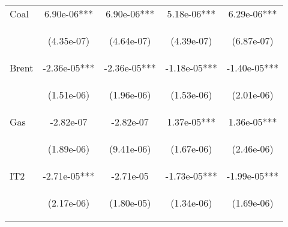 \begin{center}
\begin{tabular}{lcccc}
Coal & 6.90e-06*** & 6.90e-06*** & 5.18e-06*** & 6.29e-06*** \\
\vspace{4pt} & \begin{footnotesize}(4.35e-07)\end{footnotesize} & \begin{footnotesize}(4.64e-07)\end{footnotesize} & \begin{footnotesize}(4.39e-07)\end{footnotesize} & \begin{footnotesize}(6.87e-07)\end{footnotesize} \\
Brent & -2.36e-05*** & -2.36e-05*** & -1.18e-05*** & -1.40e-05*** \\
\vspace{4pt} & \begin{footnotesize}(1.51e-06)\end{footnotesize} & \begin{footnotesize}(1.96e-06)\end{footnotesize} & \begin{footnotesize}(1.53e-06)\end{footnotesize} & \begin{footnotesize}(2.01e-06)\end{footnotesize} \\
Gas & -2.82e-07 & -2.82e-07 & 1.37e-05*** & 1.36e-05*** \\
\vspace{4pt} & \begin{footnotesize}(1.89e-06)\end{footnotesize} & \begin{footnotesize}(9.41e-06)\end{footnotesize} & \begin{footnotesize}(1.67e-06)\end{footnotesize} & \begin{footnotesize}(2.46e-06)\end{footnotesize} \\
IT2 & -2.71e-05*** & -2.71e-05 & -1.73e-05*** & -1.99e-05*** \\
\vspace{4pt} & \begin{footnotesize}(2.17e-06)\end{footnotesize} & \begin{footnotesize}(1.80e-05)\end{footnotesize} & \begin{footnotesize}(1.34e-06)\end{footnotesize} & \begin{footnotesize}(1.69e-06)\end{footnotesize} \\

\end{tabular}
\end{center}
